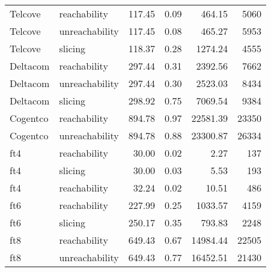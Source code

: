 \begin{tabular}{llrrrr}
Telcove & reachability & 117.45 & 0.09 & 464.15 & 5060 \\
Telcove & unreachability & 117.45 & 0.08 & 465.27 & 5953 \\
Telcove & slicing & 118.37 & 0.28 & 1274.24 & 4555 \\
Deltacom & reachability & 297.44 & 0.31 & 2392.56 & 7662 \\
Deltacom & unreachability & 297.44 & 0.30 & 2523.03 & 8434 \\
Deltacom & slicing & 298.92 & 0.75 & 7069.54 & 9384 \\
Cogentco & reachability & 894.78 & 0.97 & 22581.39 & 23350 \\
Cogentco & unreachability & 894.78 & 0.88 & 23300.87 & 26334 \\
ft4 & reachability & 30.00 & 0.02 & 2.27 & 137 \\
ft4 & slicing & 30.00 & 0.03 & 5.53 & 193 \\
ft4 & reachability & 32.24 & 0.02 & 10.51 & 486 \\
ft6 & reachability & 227.99 & 0.25 & 1033.57 & 4159 \\
ft6 & slicing & 250.17 & 0.35 & 793.83 & 2248 \\
ft8 & reachability & 649.43 & 0.67 & 14984.44 & 22505 \\
ft8 & unreachability & 649.43 & 0.77 & 16452.51 & 21430 \\
\bottomrule
\end{tabular}
